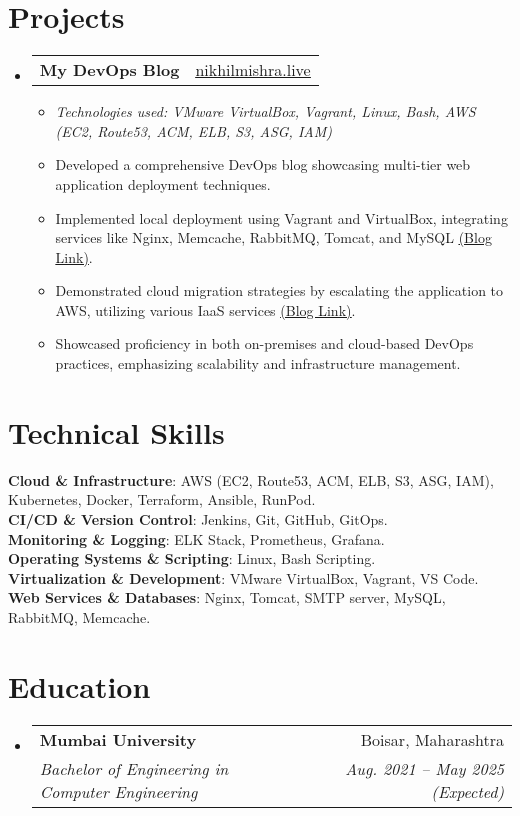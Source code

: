 \documentclass[letterpaper,11pt]{article}
\makeatletter
\newcommand{\resumeItem}[1]{
  \item\small{
    {#1 \vspace{-2pt}}
  }
}
\newcommand{\resumeSubheading}[4]{
  \vspace{-2pt}\item
    \begin{tabular*}{0.97\textwidth}[t]{l@{\extracolsep{\fill}}r}
      \textbf{#1} & #2 \\
      \textit{\small#3} & \textit{\small #4} \\
    \end{tabular*}\vspace{-7pt}
}
\newcommand{\resumeProjectHeading}[2]{
    \item
    \begin{tabular*}{0.97\textwidth}{l@{\extracolsep{\fill}}r}
      \small#1 & #2 \\
    \end{tabular*}\vspace{-7pt}
}
\newcommand{\resumeSubItem}[1]{\resumeItem{#1}\vspace{-4pt}}
\newcommand{\resumeSubHeadingListStart}{\begin{itemize}[leftmargin=0.15in, label={}]}
\newcommand{\resumeSubHeadingListEnd}{\end{itemize}}
\newcommand{\resumeItemListStart}{\begin{itemize}}
\newcommand{\resumeItemListEnd}{\end{itemize}\vspace{-5pt}}
\makeatother
\begin{document}
\section{Projects}
    \resumeSubHeadingListStart
      \resumeProjectHeading
          {\textbf{My DevOps Blog}}{\href{https://nikhilmishra.live/}{\underline{nikhilmishra.live}}}
      \resumeSubHeadingListStart
        \resumeSubItem{\textit{Technologies used: VMware VirtualBox, Vagrant, Linux, Bash, AWS (EC2, Route53, ACM, ELB, S3, ASG, IAM)}}
      \resumeSubHeadingListEnd
          \resumeItemListStart
            \resumeItem{Developed a comprehensive DevOps blog showcasing multi-tier web application deployment techniques.}
            \resumeItem{Implemented local deployment using Vagrant and VirtualBox, integrating services like Nginx, Memcache, RabbitMQ, Tomcat, and MySQL \href{https://nikhilmishra.live/i-can-setup-a-multi-tier-app-locally-for-you}{\underline{(Blog Link)}}.}
            \resumeItem{Demonstrated cloud migration strategies by escalating the application to AWS, utilizing various IaaS services \href{https://nikhilmishra.live/i-escalated-my-app-to-the-cloud}{\underline{(Blog Link)}}.}
            \resumeItem{Showcased proficiency in both on-premises and cloud-based DevOps practices, emphasizing scalability and infrastructure management.}
          \resumeItemListEnd
    \resumeSubHeadingListEnd

%
\section{Technical Skills}
 \begin{itemize}[leftmargin=0.15in, label={}]
    \small{\item{
     \textbf{Cloud \& Infrastructure}{: AWS (EC2, Route53, ACM, ELB, S3, ASG, IAM), Kubernetes, Docker, Terraform, Ansible, RunPod.}\\
     \textbf{CI/CD \& Version Control}{: Jenkins, Git, GitHub, GitOps.}\\
     \textbf{Monitoring \& Logging}{: ELK Stack, Prometheus, Grafana.}\\
     \textbf{Operating Systems \& Scripting}{: Linux, Bash Scripting.}\\
     \textbf{Virtualization \& Development}{: VMware VirtualBox, Vagrant, VS Code.}\\
     \textbf{Web Services \& Databases}{: Nginx, Tomcat, SMTP server, MySQL, RabbitMQ, Memcache.}
    }}
 \end{itemize}

\section{Education}
  \resumeSubHeadingListStart
    \resumeSubheading
      {Mumbai University}{Boisar, Maharashtra}
      {Bachelor of Engineering in Computer Engineering}{Aug. 2021 -- May 2025 (Expected)}
  \resumeSubHeadingListEnd

\end{document}
